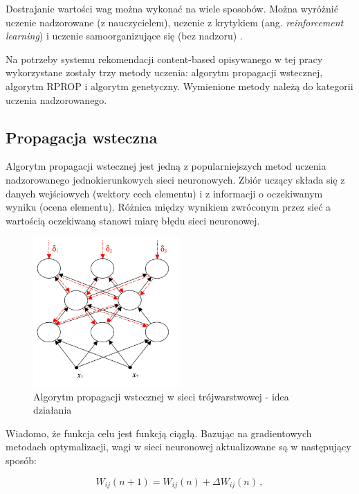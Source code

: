 \documentclass[twoside]{iisthesis}
\begin{document}
		 Dostrajanie wartości wag można wykonać na wiele sposobów. Można wyróżnić uczenie nadzorowane (z nauczycielem), uczenie z krytykiem (ang. \textit{reinforcement learning}) i uczenie samoorganizujące się (bez nadzoru) \cite{osowski1996sieci}.
		 
		 Na potrzeby systemu rekomendacji content-based opisywanego w tej pracy wykorzystane zostały trzy metody uczenia: algorytm propagacji wstecznej, algorytm RPROP i algorytm genetyczny. Wymienione metody należą do kategorii uczenia nadzorowanego. 
		 
		 
		 \subsection{Propagacja wsteczna}
	 
		 Algorytm propagacji wstecznej jest jedną z popularniejszych metod uczenia nadzorowanego jednokierunkowych sieci neuronowych. Zbiór uczący składa się z danych wejściowych (wektory cech elementu) i z informacji o oczekiwanym wyniku (ocena elementu). Różnica między wynikiem zwróconym przez sieć a wartością oczekiwaną stanowi miarę błędu sieci neuronowej. 
		 
		 \begin{figure}[!ht] 
	 		 	\centering
	 		 	\includegraphics[width=0.5\textwidth]{ilustracjabackprop}
	 		 	\caption{Algorytm propagacji wstecznej w sieci trójwarstwowej - idea działania \protect\cite{kwateralgorytmy}}
	 		 	\label{fig:ilustracjabackprop}
		 \end{figure}
		 
		 Wiadomo, że funkcja celu jest funkcją ciągłą. Bazując na gradientowych metodach optymalizacji, wagi w sieci neuronowej aktualizowane są w następujący sposób:	 
		 
 		 \begin{equation}
 		 \label{eq:weightadaptation3}
 		 W_{ij}(n+1) = W_{ij}(n) + \Delta W_{ij}(n) 
 		 \,,
 		 \end{equation}
 		 
\end{document}
